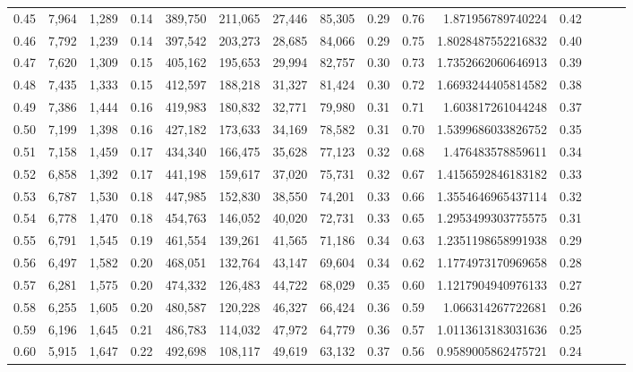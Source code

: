 \begin{tabular}{rrrrrrrrrrrrrrr}
0.45 &   7,964 &  1,289 &  0.14 &  389,750 &  211,065 &   27,446 &   85,305 &  0.29 &  0.76 &       1.871956789740224 &      0.42 \\
0.46 &   7,792 &  1,239 &  0.14 &  397,542 &  203,273 &   28,685 &   84,066 &  0.29 &  0.75 &      1.8028487552216832 &      0.40 \\
0.47 &   7,620 &  1,309 &  0.15 &  405,162 &  195,653 &   29,994 &   82,757 &  0.30 &  0.73 &      1.7352662060646913 &      0.39 \\
0.48 &   7,435 &  1,333 &  0.15 &  412,597 &  188,218 &   31,327 &   81,424 &  0.30 &  0.72 &      1.6693244405814582 &      0.38 \\
0.49 &   7,386 &  1,444 &  0.16 &  419,983 &  180,832 &   32,771 &   79,980 &  0.31 &  0.71 &       1.603817261044248 &      0.37 \\
0.50 &   7,199 &  1,398 &  0.16 &  427,182 &  173,633 &   34,169 &   78,582 &  0.31 &  0.70 &      1.5399686033826752 &      0.35 \\
0.51 &   7,158 &  1,459 &  0.17 &  434,340 &  166,475 &   35,628 &   77,123 &  0.32 &  0.68 &       1.476483578859611 &      0.34 \\
0.52 &   6,858 &  1,392 &  0.17 &  441,198 &  159,617 &   37,020 &   75,731 &  0.32 &  0.67 &      1.4156592846183182 &      0.33 \\
0.53 &   6,787 &  1,530 &  0.18 &  447,985 &  152,830 &   38,550 &   74,201 &  0.33 &  0.66 &      1.3554646965437114 &      0.32 \\
0.54 &   6,778 &  1,470 &  0.18 &  454,763 &  146,052 &   40,020 &   72,731 &  0.33 &  0.65 &      1.2953499303775575 &      0.31 \\
0.55 &   6,791 &  1,545 &  0.19 &  461,554 &  139,261 &   41,565 &   71,186 &  0.34 &  0.63 &      1.2351198658991938 &      0.29 \\
0.56 &   6,497 &  1,582 &  0.20 &  468,051 &  132,764 &   43,147 &   69,604 &  0.34 &  0.62 &      1.1774973170969658 &      0.28 \\
0.57 &   6,281 &  1,575 &  0.20 &  474,332 &  126,483 &   44,722 &   68,029 &  0.35 &  0.60 &      1.1217904940976133 &      0.27 \\
0.58 &   6,255 &  1,605 &  0.20 &  480,587 &  120,228 &   46,327 &   66,424 &  0.36 &  0.59 &       1.066314267722681 &      0.26 \\
0.59 &   6,196 &  1,645 &  0.21 &  486,783 &  114,032 &   47,972 &   64,779 &  0.36 &  0.57 &      1.0113613183031636 &      0.25 \\
0.60 &   5,915 &  1,647 &  0.22 &  492,698 &  108,117 &   49,619 &   63,132 &  0.37 &  0.56 &      0.9589005862475721 &      0.24 \\

\end{tabular}
